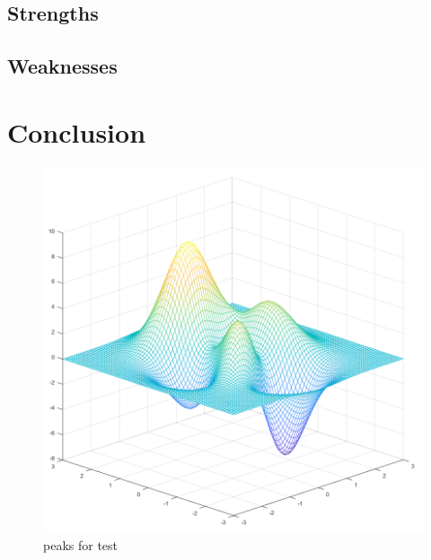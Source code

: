 \documentclass{HZNUMCM}
\begin{document}
    \subsection{Strengths}
    \subsection{Weaknesses}

  \section{Conclusion}
  \begin{figure}[ht]
    \centering
    \includegraphics[width=0.5\linewidth]{images/peaks.png} %
    \caption{peaks for test}
    \label{fig:image1}
  \end{figure}
\end{document}
